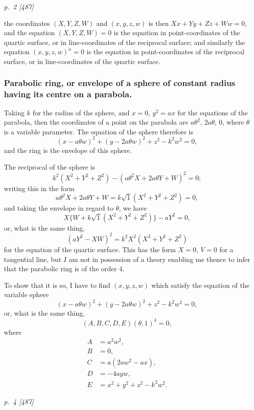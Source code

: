 \documentclass[11pt,a4paper]{book}
\begin{document}
\bigskip
\textit{p.~2 [487]}
\smallskip

\noindent
the coordinates $(X, Y, Z, W)$ and $(x, y, z, w)$ is then $X x + Y y + Z z + W w = 0$,
and the equation $(X, Y, Z, W) = 0$ is the equation in point-coordinates of the quartic surface,
or in line-coordinates of the reciprocal surface; and similarly the equation $(x, y, z, w)^n = 0$
is the equation in point-coordinates of the reciprocal surface, or in line-coordinates of
the quartic surface.

\subsubsection*{Parabolic ring, or envelope of a sphere of constant radius having its centre on a parabola.}

Taking $k$ for the radius of the sphere, and $x = 0$, $y^2 = a x$ for the equations of
the parabola, then the coordinates of a point on the parabola are $a\theta^2$, $2a\theta$, $0$, where
$\theta$ is a variable parameter.  The equation of the sphere therefore is
\[
(x - a\theta w)^2 + (y - 2a\theta w)^2 + z^2 - k^2 w^2 = 0,
\]
and the ring is the envelope of this sphere.

The reciprocal of the sphere is
\[
k^2 (X^2 + Y^2 + Z^2) - (a\theta^2 X + 2a\theta Y + W)^2 = 0;
\]
writing this in the form
\[
a\theta^2 X + 2a\theta Y + W = k\sqrt{1}(X^2 + Y^2 + Z^2) = 0,
\]
and taking the envelope in regard to $\theta$, we have
\[
X\{W + k\sqrt{1}(X^2 + Y^2 + Z^2)\} - aY^2 = 0,
\]
or, what is the same thing,
\[
(aY^2 - XW)^2 = k^2 X^2 (X^2 + Y^2 + Z^2)
\]
for the equation of the quartic surface.  This has the form $X = 0$, $V = 0$ for a tangential
line, but $I$ am not in possession of a theory enabling me thence to infer that the
parabolic ring is of the order 4.

To show that it is so, I have to find $(x, y, z, w)$ which satisfy the equation
of the variable sphere
\[
(x - a\theta w)^2 + (y - 2a\theta w)^2 + z^2 - k^2 w^2 = 0,
\]
or, what is the same thing,
\[
(A, B, C, D, E)(\theta, 1)^4 = 0,
\]
where
\begin{align*}
A &= a^2 w^2, \\
B &= 0, \\
C &= a(2aw^2 - ax), \\
D &= -4ayw, \\
E &= x^2 + y^2 + z^2 - k^2 w^2.
\end{align*}

\clearpage

\bigskip
\textit{p.~4 [487]}
\smallskip
\end{document}
